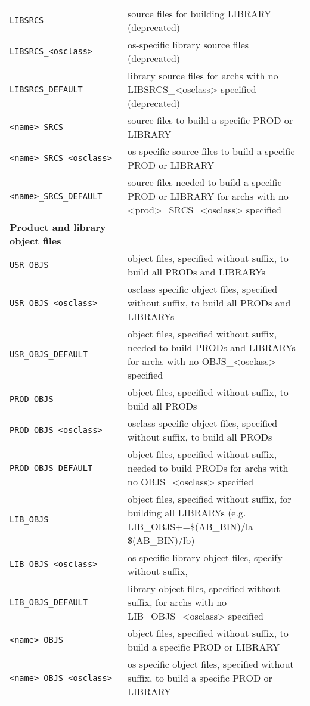 \begin{center}
\begin{longtable}{p{2.94784in}p{3.76247in}}
\verb|LIBSRCS| & source files for building LIBRARY (deprecated)\\
\verb|LIBSRCS_<osclass>| & os-specific library source files (deprecated)\\
\verb|LIBSRCS_DEFAULT| & library source files for archs with no LIBSRCS\_\textless{}osclass\textgreater{} specified (deprecated)\\
\verb|<name>_SRCS| & source files to build a specific PROD or LIBRARY\\
\verb|<name>_SRCS_<osclass>| & os specific source files to build a specific PROD or LIBRARY\\
\verb|<name>_SRCS_DEFAULT| & source files needed to build a specific PROD or LIBRARY for archs with no \textless{}prod\textgreater{}\_SRCS\_\textless{}osclass\textgreater{} specified\\
\textbf{Product and library object files} & \\
\hline
\verb|USR_OBJS| & object files, specified without suffix, to build all PRODs and LIBRARYs\\
\verb|USR_OBJS_<osclass>| & osclass specific object files, specified without suffix, to build all PRODs and LIBRARYs\\
\verb|USR_OBJS_DEFAULT| & object files, specified without suffix, needed to build PRODs and LIBRARYs for archs with no OBJS\_\textless{}osclass\textgreater{} specified\\
\verb|PROD_OBJS| & object files, specified without suffix, to build all PRODs\\
\verb|PROD_OBJS_<osclass>| & osclass specific object files, specified without suffix, to build all PRODs\\
\verb|PROD_OBJS_DEFAULT| & object files, specified without suffix, needed to build PRODs for archs with no OBJS\_\textless{}osclass\textgreater{} specified\\
\verb|LIB_OBJS| & object files, specified without suffix, for building all LIBRARYs (e.g. LIB\_OBJS+=\$(AB\_BIN)/la \$(AB\_BIN)/lb)\\
\verb|LIB_OBJS_<osclass>| & os-specific library object files, specify without suffix,\\
\verb|LIB_OBJS_DEFAULT| & library object files, specified without suffix, for archs with no LIB\_OBJS\_\textless{}osclass\textgreater{} specified\\
\verb|<name>_OBJS| & object files, specified without suffix, to build a specific PROD or LIBRARY\\
\verb|<name>_OBJS_<osclass>| & os specific object files, specified without suffix, to build a specific PROD or LI\textbar{}BRARY\\

\end{longtable}
\end{center}
